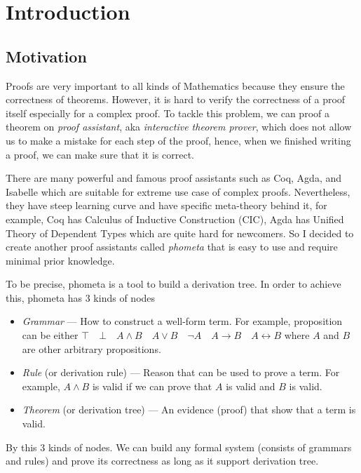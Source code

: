 \documentclass[master.tex]{subfiles}
\begin{document}
\chapter{Introduction}

\section{Motivation}

Proofs are very important to all kinds of Mathematics because they ensure the
correctness of theorems. However, it is hard to verify the correctness of a
proof itself especially for a complex proof. To tackle this problem, we can
proof a theorem on \emph{proof assistant}, aka \emph{interactive theorem
  prover}, which does not allow us to make a mistake for each step of the proof,
hence, when we finished writing a proof, we can make sure that it is correct.

There are many powerful and famous proof assistants such as
Coq\supercite{coq-official-website}, Agda\supercite{agda-official-website}, and
Isabelle\supercite{isabelle-official-website} which are suitable for extreme use
case of complex proofs. Nevertheless, they have steep learning curve and have
specific meta-theory behind it, for example, Coq has Calculus of Inductive
Construction (CIC), Agda has Unified Theory of Dependent
Types\supercite{norell:thesis}\supercite{Luo:1994:CRT:184757} which are quite
hard for newcomers. So I decided to create another proof assistants called
\emph{phometa} that is easy to use and require minimal prior knowledge.

To be precise, phometa is a tool to build a derivation tree. In order to achieve
this, phometa has 3 kinds of nodes
\begin{itemize}
\item \emph{Grammar} --- How to construct a well-form term. For example,
  proposition can be either
  $\top \quad \bot \quad A \wedge B \quad A \vee B \quad \neg A \quad A
  \rightarrow B \quad A \leftrightarrow B$ where $A$ and $B$ are other arbitrary
  propositions.
\item \emph{Rule} (or derivation rule) --- Reason that can be used to prove a
  term. For example, $A \wedge B$ is valid if we can prove that $A$ is valid and
  $B$ is valid.
\item \emph{Theorem} (or derivation tree) --- An evidence (proof) that show that
  a term is valid.
\end{itemize}
By this 3 kinds of nodes. We can build any formal system (consists of grammars
and rules) and prove its correctness as long as it support derivation tree.
\end{document}
